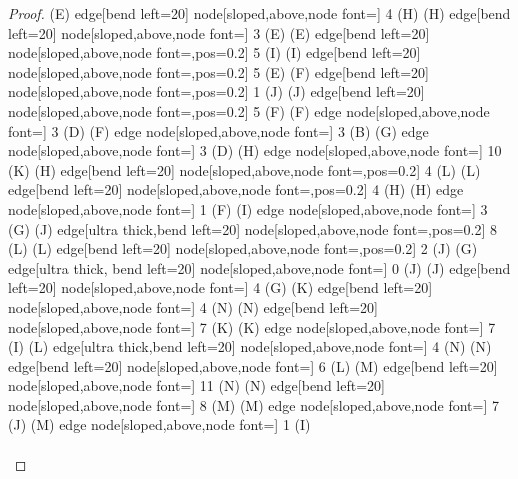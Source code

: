 \begin{proof}
{(E) edge[bend left=20]
 node[sloped,above,node font=\tiny] {4} (H)
(H) edge[bend left=20]  node[sloped,above,node font=\tiny] {3} (E)
(E) edge[bend left=20]
 node[sloped,above,node font=\tiny,pos=0.2] {5} (I)
(I) edge[bend left=20]  node[sloped,above,node font=\tiny,pos=0.2] {5} (E)
(F) edge[bend left=20]
 node[sloped,above,node font=\tiny,pos=0.2] {1} (J)
(J) edge[bend left=20]  node[sloped,above,node font=\tiny,pos=0.2] {5} (F)
(F) edge node[sloped,above,node font=\tiny] {3} (D)
(F) edge node[sloped,above,node font=\tiny] {3} (B)
(G) edge node[sloped,above,node font=\tiny] {3} (D)
(H) edge node[sloped,above,node font=\tiny] {10} (K)
(H) edge[bend left=20]
 node[sloped,above,node font=\tiny,pos=0.2] {4} (L)
(L) edge[bend left=20]  node[sloped,above,node font=\tiny,pos=0.2] {4} (H)
(H) edge node[sloped,above,node font=\tiny] {1} (F)
(I) edge node[sloped,above,node font=\tiny] {3} (G)
(J) edge[ultra thick,bend left=20]
 node[sloped,above,node font=\tiny,pos=0.2] {8} (L)
(L) edge[bend left=20]  node[sloped,above,node font=\tiny,pos=0.2] {2} (J)
(G) edge[ultra thick, bend left=20]  node[sloped,above,node font=\tiny] {0} (J)
(J) edge[bend left=20]  node[sloped,above,node font=\tiny] {4} (G)
(K) edge[bend left=20]
 node[sloped,above,node font=\tiny] {4} (N)
(N) edge[bend left=20]  node[sloped,above,node font=\tiny] {7} (K)
(K) edge node[sloped,above,node font=\tiny] {7} (I)
(L) edge[ultra thick,bend left=20]
 node[sloped,above,node font=\tiny] {4} (N)
(N) edge[bend left=20]  node[sloped,above,node font=\tiny] {6} (L)
(M) edge[bend left=20]
 node[sloped,above,node font=\tiny] {11} (N)
(N) edge[bend left=20]  node[sloped,above,node font=\tiny] {8} (M)
(M) edge node[sloped,above,node font=\tiny] {7} (J)
(M) edge node[sloped,above,node font=\tiny] {1} (I)
}\\\\
\usetikzlibrary{graphs,automata,positioning}
\end{proof}
